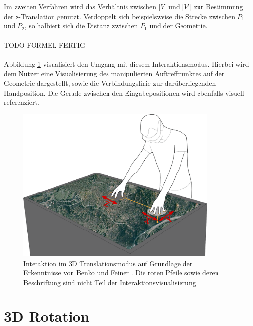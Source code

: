 \\\\
Im zweiten Verfahren wird das Verhältnis zwischen $|V|$ und $|V‘|$ zur Bestimmung der z-Translation genutzt. Verdoppelt sich beispielsweise die Strecke zwischen $P_1$ und $P_2$, so halbiert sich die Distanz zwischen $P_1$ und der Geometrie.
\\\\
TODO FORMEL FERTIG
\\\\
Abbildung \ref{fig:baloon_interaction} visualisiert den Umgang mit diesem Interaktionsmodus. Hierbei wird dem Nutzer eine Visualisierung des manipulierten Auftreffpunktes auf der Geometrie dargestellt, sowie die Verbindungslinie zur darüberliegenden Handposition. Die Gerade zwischen den Eingabepositionen wird ebenfalls visuell referenziert.

\begin{figure}
	\begin{center}
		\includegraphics[width=10cm]{img/baloon_interaction.pdf}
	\end{center}
	\caption{Interaktion im 3D Translationsmodus auf Grundlage der Erkenntnisse von Benko und Feiner \cite{benko:2007}. Die roten Pfeile sowie deren Beschriftung sind nicht Teil der Interaktionsvisualisierung}
	\label{fig:baloon_interaction}
\end{figure}

\section{3D Rotation}
\label{sec:3d_rotation}


